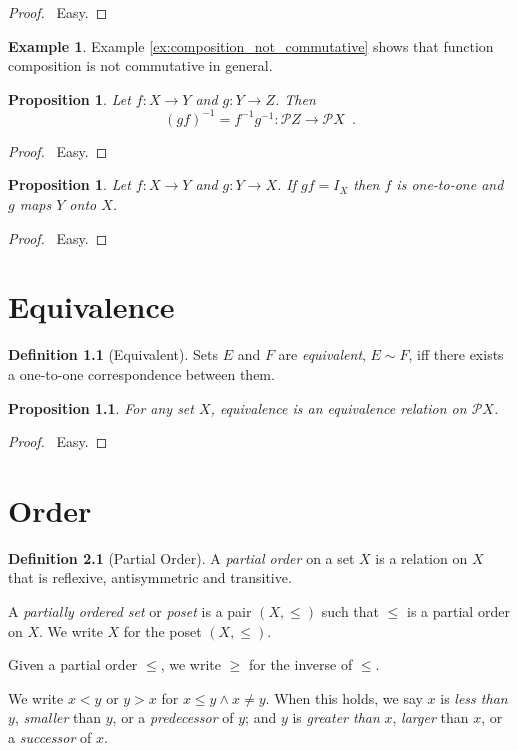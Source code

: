 \documentclass{report}
\let\qed\relax
\newtheorem{prop}[ax]{Proposition}
\theoremstyle{definition}
\newtheorem{df}[ax]{Definition}
\newtheorem{ex}[ax]{Example}
\begin{document}
\begin{proof}
\pf\ Easy. \qed
\end{proof}

\begin{ex}
Example \ref{ex:composition_not_commutative} shows that function composition is not commutative in general.
\end{ex}

\begin{prop}
Let $f : X \rightarrow Y$ and $g : Y \rightarrow Z$. Then
\[ (gf)^{-1} = f^{-1}g^{-1} : \mathcal{P} Z \rightarrow \mathcal{P} X \enspace . \]
\end{prop}

\begin{proof}
\pf\ Easy. \qed
\end{proof}

\begin{prop}
Let $f : X \rightarrow Y$ and $g : Y \rightarrow X$. If $gf = I_X$ then $f$ is one-to-one and $g$ maps $Y$ onto $X$.
\end{prop}

\begin{proof}
\pf\ Easy. \qed
\end{proof}

\chapter{Equivalence}

\begin{df}[Equivalent]
Sets $E$ and $F$ are \emph{equivalent}, $E \sim F$, iff there exists a one-to-one correspondence between them.
\end{df}

\begin{prop}
For any set $X$, equivalence is an equivalence relation on $\mathcal{P} X$.
\end{prop}

\begin{proof}
\pf\ Easy.
\end{proof}

\chapter{Order}

\begin{df}[Partial Order]
A \emph{partial order} on a set $X$ is a relation on $X$ that is reflexive, antisymmetric and transitive.

A \emph{partially ordered set} or \emph{poset} is a pair $(X, \leq)$ such that $\leq$ is a partial order on $X$.
We write $X$ for the poset $(X, \leq)$.

Given a partial order $\leq$, we write $\geq$ for the inverse of $\leq$.

We write $x < y$ or $y > x$ for $x \leq y \wedge x \neq y$. When this holds, we say $x$ is \emph{less than} $y$, \emph{smaller} than $y$, or a \emph{predecessor} of $y$; and $y$ is \emph{greater than} $x$, \emph{larger} than $x$, or a \emph{successor} of $x$.
\end{df}
\end{document}
